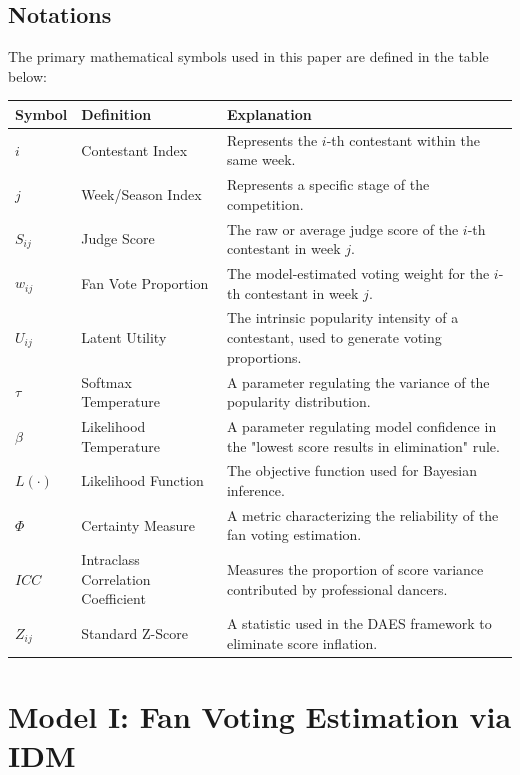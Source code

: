 \documentclass[12pt]{article}
\begin{document}
	\subsection{Notations}
	The primary mathematical symbols used in this paper are defined in the table below:
	
	\begin{table}[htbp]
		\centering
		\small
		\begin{tabularx}{\linewidth}{>{\raggedright\arraybackslash}p{1.2cm}>{\raggedright\arraybackslash}p{2.8cm}X}
			\toprule
			Symbol & Definition & Explanation \\
			\midrule
			$i$ & Contestant Index & Represents the $i$-th contestant within the same week. \\
			$j$ & Week/Season Index & Represents a specific stage of the competition. \\
			$S_{ij}$ & Judge Score & The raw or average judge score of the $i$-th contestant in week $j$. \\
			$w_{ij}$ & Fan Vote Proportion & The model-estimated voting weight for the $i$-th contestant in week $j$. \\
			$U_{ij}$ & Latent Utility & The intrinsic popularity intensity of a contestant, used to generate voting proportions. \\
			$\tau$ & Softmax Temperature & A parameter regulating the variance of the popularity distribution. \\
			$\beta$ & Likelihood Temperature & A parameter regulating model confidence in the "lowest score results in elimination" rule. \\
			$L(\cdot)$ & Likelihood Function & The objective function used for Bayesian inference. \\
			$\Phi$ & Certainty Measure & A metric characterizing the reliability of the fan voting estimation. \\
			$ICC$ & Intraclass Correlation Coefficient & Measures the proportion of score variance contributed by professional dancers. \\
			$Z_{ij}$ & Standard Z-Score & A statistic used in the DAES framework to eliminate score inflation. \\
			\bottomrule
		\end{tabularx}
	\end{table}
	
	\section{Model I: Fan Voting Estimation via IDM}
\end{document}
